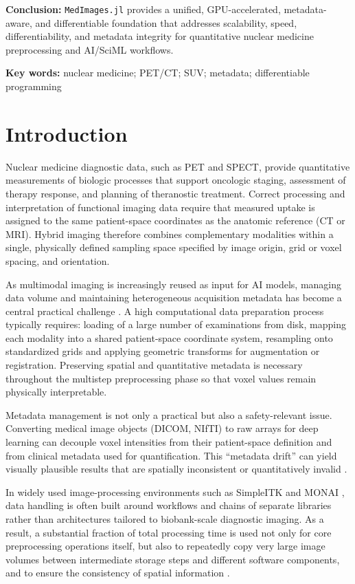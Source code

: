 \documentclass[a4paper,10pt]{elsarticle}
\begin{document}
\textbf{Conclusion:} \texttt{MedImages.jl} provides a unified, GPU-accelerated, metadata-aware, and differentiable foundation that addresses scalability, speed, differentiability, and metadata integrity for quantitative nuclear medicine preprocessing and AI/SciML workflows.

\textbf{Key words:} nuclear medicine; PET/CT; SUV; metadata; differentiable programming

\section{Introduction}

Nuclear medicine diagnostic data, such as PET and SPECT, provide quantitative measurements of biologic processes that support oncologic staging, assessment of therapy response, and planning of theranostic treatment. Correct processing and interpretation of functional imaging data require that measured uptake is assigned to the same patient-space coordinates as the anatomic reference (CT or MRI). Hybrid imaging therefore combines complementary modalities within a single, physically defined sampling space specified by image origin, grid or voxel spacing, and orientation. 
 
As multimodal imaging is increasingly reused as input for AI models, managing data volume and maintaining heterogeneous acquisition metadata has become a central practical challenge \cite{}. A high computational data preparation process typically requires: loading of a large number of examinations from disk, mapping each modality into a shared patient-space coordinate system, resampling onto standardized grids and applying geometric transforms for augmentation or registration. Preserving spatial and quantitative metadata is necessary throughout the multistep preprocessing phase so that voxel values remain physically interpretable. 

Metadata management is not only a practical but also a safety-relevant issue. Converting medical image objects (DICOM, NIfTI) to raw arrays for deep learning can decouple voxel intensities from their patient-space definition and from clinical metadata used for quantification. This ``metadata drift'' can yield visually plausible results that are spatially inconsistent or quantitatively invalid \cite{}.

In widely used image-processing environments such as SimpleITK \cite{LowekampChen2013} and MONAI \cite{CardosoLi2022}, data handling is often built around workflows and chains of separate libraries rather than architectures tailored to biobank-scale diagnostic imaging. As a result, a substantial fraction of total processing time is used not only for core preprocessing operations itself, but also to repeatedly copy very large image volumes between intermediate storage steps and different software components, and to ensure the consistency of spatial information \cite{Dexl_2025}.
\end{document}
